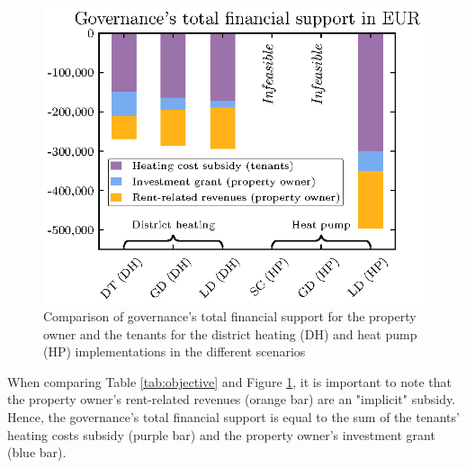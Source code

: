 \begin{figure}[h]
	\centering
	\includegraphics[width=0.7\linewidth]{figures/4_Results/fig_npv_comparison/net_present_value.eps}
	\caption{Comparison of governance's total financial support for the property owner and the tenants for the district heating (DH) and heat pump (HP) implementations in the different scenarios}
	\label{fig:npv_comparison}
\end{figure}

When comparing Table \ref{tab:objective} and Figure \ref{fig:npv_comparison}, it is important to note that the property owner's rent-related revenues (orange bar) are an "implicit" subsidy. Hence, the governance's total financial support is equal to the sum of the tenants' heating costs subsidy (purple bar) and the property owner's investment grant (blue bar). 


